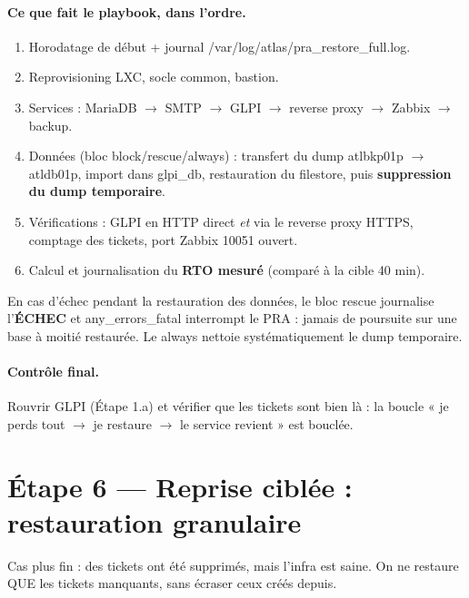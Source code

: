 \documentclass[11pt,a4paper]{article}
\newcommand{\cmd}[1]{{\ttfamily #1}}
\begin{document}
\paragraph{Ce que fait le playbook, dans l'ordre.}
\begin{enumerate}[leftmargin=1.6em]
  \item Horodatage de début + journal \cmd{/var/log/atlas/pra_restore_full.log}.
  \item Reprovisioning LXC, socle \cmd{common}, bastion.
  \item Services : MariaDB $\rightarrow$ SMTP $\rightarrow$ GLPI $\rightarrow$ reverse proxy
        $\rightarrow$ Zabbix $\rightarrow$ backup.
  \item Données (bloc \cmd{block/rescue/always}) : transfert du dump
        \cmd{atlbkp01p} $\rightarrow$ \cmd{atldb01p}, import dans \cmd{glpi_db},
        restauration du filestore, puis \textbf{suppression du dump temporaire}.
  \item Vérifications : GLPI en HTTP direct \emph{et} via le reverse proxy HTTPS, comptage
        des tickets, port Zabbix 10051 ouvert.
  \item Calcul et journalisation du \textbf{RTO mesuré} (comparé à la cible 40 min).
\end{enumerate}

\begin{attention}
En cas d'échec pendant la restauration des données, le bloc \cmd{rescue} journalise
l'\textbf{ÉCHEC} et \cmd{any_errors_fatal} interrompt le PRA : jamais de poursuite sur une
base à moitié restaurée. Le \cmd{always} nettoie systématiquement le dump temporaire.
\end{attention}

\paragraph{Contrôle final.} Rouvrir GLPI (Étape 1.a) et vérifier que les tickets sont bien
là : la boucle « je perds tout $\rightarrow$ je restaure $\rightarrow$ le service revient »
est bouclée.

\section{Étape 6 — Reprise ciblée : restauration granulaire}
\begin{etape}{Cas plus fin : des tickets ont été supprimés, mais l'infra est saine. On ne
restaure QUE les tickets manquants, sans écraser ceux créés depuis.}
\end{etape}
\end{document}
